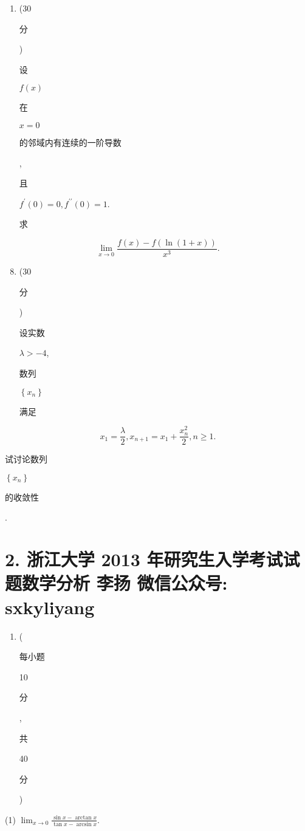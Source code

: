 \documentclass[10pt]{article}
\begin{document}
\begin{enumerate}
  \item (30 \begin{CJK}{UTF8}{mj}分\end{CJK}) \begin{CJK}{UTF8}{mj}设\end{CJK} $f(x)$ \begin{CJK}{UTF8}{mj}在\end{CJK} $x=0$ \begin{CJK}{UTF8}{mj}的邻域内有连续的一阶导数\end{CJK}, \begin{CJK}{UTF8}{mj}且\end{CJK} $f^{\prime}(0)=0, f^{\prime \prime}(0)=1$. \begin{CJK}{UTF8}{mj}求\end{CJK}

\end{enumerate}
$$
\lim _{x \rightarrow 0} \frac{f(x)-f(\ln (1+x))}{x^{3}} .
$$

\begin{enumerate}
  \setcounter{enumi}{7}
  \item (30 \begin{CJK}{UTF8}{mj}分\end{CJK}) \begin{CJK}{UTF8}{mj}设实数\end{CJK} $\lambda>-4$, \begin{CJK}{UTF8}{mj}数列\end{CJK} $\left\{x_{n}\right\}$ \begin{CJK}{UTF8}{mj}满足\end{CJK}
\end{enumerate}
$$
x_{1}=\frac{\lambda}{2}, x_{n+1}=x_{1}+\frac{x_{n}^{2}}{2}, n \geqslant 1 .
$$
\begin{CJK}{UTF8}{mj}试讨论数列\end{CJK} $\left\{x_{n}\right\}$ \begin{CJK}{UTF8}{mj}的收敛性\end{CJK}.

\section{2. 浙江大学 2013 年研究生入学考试试题数学分析 
 李扬 
 微信公众号: sxkyliyang}
\begin{enumerate}
  \item (\begin{CJK}{UTF8}{mj}每小题\end{CJK} 10 \begin{CJK}{UTF8}{mj}分\end{CJK}, \begin{CJK}{UTF8}{mj}共\end{CJK} 40 \begin{CJK}{UTF8}{mj}分\end{CJK})
\end{enumerate}
(1) $\lim _{x \rightarrow 0} \frac{\sin x-\arctan x}{\tan x-\arcsin x}$.
\end{document}
